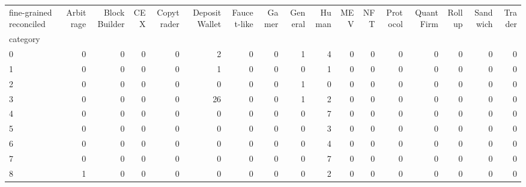 \begin{tabular}{lrrrrrrrrrrrrrrrr}
\toprule
fine-grained reconciled &  Arbitrage &  Block Builder &  CEX &  Copytrader &  Deposit Wallet &  Faucet-like &  Gamer &  General &  Human &  MEV &  NFT &  Protocol &  Quant Firm &  Rollup &  Sandwich &  Trader \\
category &            &                &      &             &                 &              &        &          &        &      &      &           &             &         &           &         \\
\midrule
0        &          0 &              0 &    0 &           0 &               2 &            0 &      0 &        1 &      4 &    0 &    0 &         0 &           0 &       0 &         0 &       0 \\
1        &          0 &              0 &    0 &           0 &               1 &            0 &      0 &        0 &      1 &    0 &    0 &         0 &           0 &       0 &         0 &       0 \\
2        &          0 &              0 &    0 &           0 &               0 &            0 &      0 &        1 &      0 &    0 &    0 &         0 &           0 &       0 &         0 &       0 \\
3        &          0 &              0 &    0 &           0 &              26 &            0 &      0 &        1 &      2 &    0 &    0 &         0 &           0 &       0 &         0 &       0 \\
4        &          0 &              0 &    0 &           0 &               0 &            0 &      0 &        0 &      7 &    0 &    0 &         0 &           0 &       0 &         0 &       0 \\
5        &          0 &              0 &    0 &           0 &               0 &            0 &      0 &        0 &      3 &    0 &    0 &         0 &           0 &       0 &         0 &       0 \\
6        &          0 &              0 &    0 &           0 &               0 &            0 &      0 &        0 &      4 &    0 &    0 &         0 &           0 &       0 &         0 &       0 \\
7        &          0 &              0 &    0 &           0 &               0 &            0 &      0 &        0 &      7 &    0 &    0 &         0 &           0 &       0 &         0 &       0 \\
8        &          1 &              0 &    0 &           0 &               0 &            0 &      0 &        0 &      2 &    0 &    0 &         0 &           0 &       0 &         0 &       0 \\

\end{tabular}
